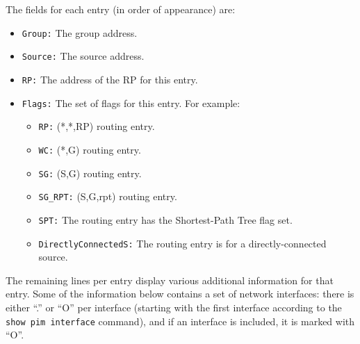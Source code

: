 The fields for each entry (in order of appearance) are:
\begin{itemize}

  \item {\tt Group:} The group address.

  \item {\tt Source:} The source address.

  \item {\tt RP:} The address of the RP for this entry.

  \item {\tt Flags:} The set of flags for this entry. For example:

  \begin{itemize}

    \item {\tt RP:} (*,*,RP) routing entry.

    \item {\tt WC:} (*,G) routing entry.

    \item {\tt SG:} (S,G) routing entry.

    \item {\tt SG\_RPT:} (S,G,rpt) routing entry.

    \item {\tt SPT:} The routing entry has the Shortest-Path Tree flag set.

    \item {\tt DirectlyConnectedS:} The routing entry is for a
    directly-connected source.

  \end{itemize}

\end{itemize}

The remaining lines per entry display various additional information for that
entry. Some of the information below contains a set of network interfaces:
there is either ``.'' or ``O'' per interface (starting with the first
interface according to the {\tt show pim interface} command), and if an
interface is included, it is marked with ``O''.

